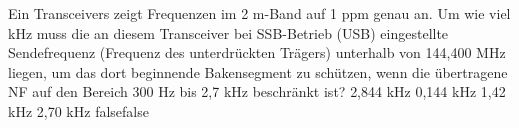     {Ein Transceivers zeigt Frequenzen im 2 m-Band auf 1 ppm genau an. Um wie viel kHz muss die an diesem Transceiver bei SSB-Betrieb (USB) eingestellte Sendefrequenz (Frequenz des unterdrückten Trägers) unterhalb von 144,400 MHz liegen, um das dort beginnende Bakensegment zu schützen, wenn die übertragene NF auf den Bereich 300 Hz bis 2,7 kHz beschränkt ist?}
    {2,844 kHz}
    {0,144 kHz}
    {1,42 kHz}
    {2,70 kHz}
    {false}{false}